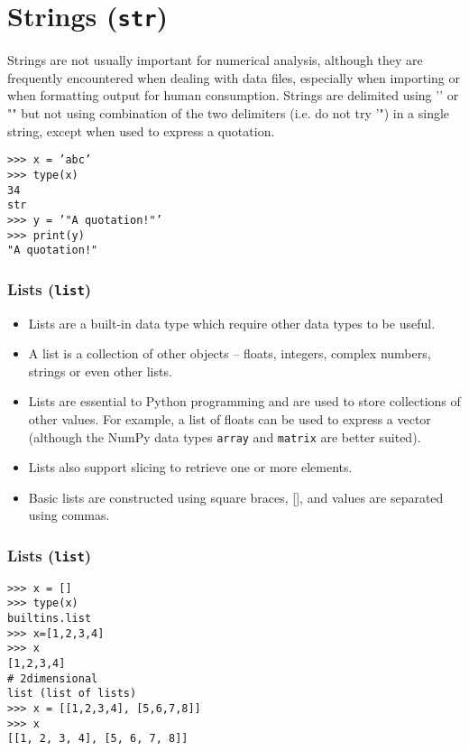 \documentclass[KSmainSlides.tex]{subfiles}
\begin{document}
\section{Strings (\texttt{str})}

\begin{frame}[fragile]
\noindent Strings are not usually important for numerical analysis, although they are frequently encountered when
dealing with data files, especially when importing or when formatting output for human consumption.
Strings are delimited using ’’ or "" but not using combination of the two delimiters (i.e. do not try ’") in
a single string, except when used to express a quotation.
\begin{framed}
\begin{verbatim}
>>> x = ’abc’
>>> type(x)
34
str
>>> y = ’"A quotation!"’
>>> print(y)
"A quotation!"
\end{verbatim}
\end{framed}
\end{frame}
\begin{frame}[fragile]
\frametitle{Lists (\texttt{list})}
\begin{itemize}
\item Lists are a built-in data type which require other data types to be useful. 
\item A list is a collection of other objects
– floats, integers, complex numbers, strings or even other lists. 
\item Lists are essential to Python programming
and are used to store collections of other values. For example, a list of floats can be used to express a vector
(although the NumPy data types \texttt{array} and \texttt{matrix} are better suited). 
\item Lists also support slicing to retrieve
one or more elements. 
\item Basic lists are constructed using square braces, [], and values are separated using
commas.
\end{itemize}
\end{frame}
\begin{frame}[fragile]
\frametitle{Lists (\texttt{list})}
\begin{framed}
\begin{verbatim}
>>> x = []
>>> type(x)
builtins.list
>>> x=[1,2,3,4]
>>> x
[1,2,3,4]
# 2dimensional
list (list of lists)
>>> x = [[1,2,3,4], [5,6,7,8]]
>>> x
[[1, 2, 3, 4], [5, 6, 7, 8]]
\end{verbatim}
\end{framed}
\end{frame}
\end{document}
